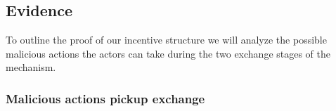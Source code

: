 \subsection{Evidence}

%
%

To outline the proof of our incentive structure we will analyze the possible malicious actions the actors can take during the two exchange stages of the mechanism.

\subsubsection{Malicious actions pickup exchange}

